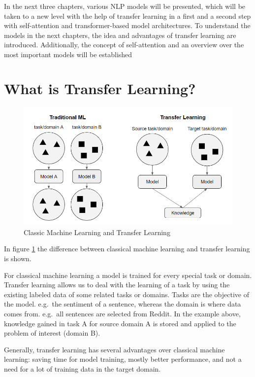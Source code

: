 \documentclass[]{krantz}
\begin{document}
In the next three chapters, various NLP models will be presented, which will be taken to a new level with the help of transfer learning in a first and a second step with self-attention and transformer-based model architectures. To understand the models in the next chapters, the idea and advantages of transfer learning are introduced. Additionally, the concept of self-attention and an overview over the most important models will be established

\hypertarget{what-is-transfer-learning}{%
\section{What is Transfer Learning?}\label{what-is-transfer-learning}}

\begin{figure}

{\centering \includegraphics[width=0.7\linewidth]{figures/02-00-transfer-learning-for-nlp/compare-classical-transferlearning-ml} 

}

\caption{Classic Machine Learning and Transfer Learning}\label{fig:ch02-figure01}
\end{figure}



In figure \ref{fig:ch02-figure01} the difference between classical machine learning and transfer learning is shown.

For classical machine learning a model is trained for every special task or domain.
Transfer learning allows us to deal with the learning of a task by using the existing labeled data of some related tasks or domains. Tasks are the objective of the model. e.g.~the sentiment of a sentence, whereas the domain is where data comes from. e.g.~all sentences are selected from Reddit. In the example above, knowledge gained in task A for source domain A is stored and applied to the problem of interest (domain B).

Generally, transfer learning has several advantages over classical machine learning: saving time for model training, mostly better performance, and not a need for a lot of training data in the target domain.
\end{document}

